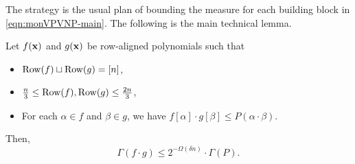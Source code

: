 The strategy is the usual plan of bounding the measure for each building block in \eqref{eqn:monVPVNP-main}. The following is the main technical lemma.

\begin{lemma} \label{lem:monVPVNP-weakness-lemma}
  Let $f(\mathbf{x})$ and $g(\mathbf{x})$ be row-aligned polynomials such that
  \begin{itemize}\itemsep 0pt
  \item $\operatorname{Row}(f) \sqcup \operatorname{Row}(g) = [n]$,
  \item $\frac{n}{3} \leq \operatorname{Row}(f),\operatorname{Row}(g) \leq \frac{2n}{3}$,
  \item For each $\alpha \in f$ and $\beta \in g$, we have $f[\alpha] \cdot g[\beta] \leq P(\alpha \cdot \beta)$.
  \end{itemize}
  Then,
  \[
    \Gamma(f \cdot g) \leq 2^{-\Omega(\delta n)} \cdot \Gamma(P).
  \]
\end{lemma}

